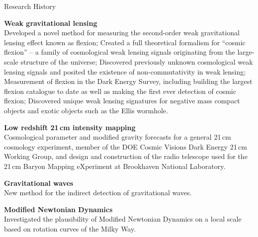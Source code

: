 \documentclass{resume} %
\begin{document}
\begin{rSection}{Research History}

\begin{description}[leftmargin=8em, style=nextline]

\item[\textnormal{2018 -- Present}] \textbf{Weak gravitational lensing}\\
   Developed a novel method for measuring the second-order weak gravitational lensing effect known as flexion;
  Created a full theoretical formalism for ``cosmic flexion'' -- a family of cosmological weak lensing signals originating from the large-scale structure of the universe;  Discovered previously unknown cosmological weak lensing signals and posited the existence of non-commutativity in weak lensing;
  Measurement of flexion in the Dark Energy Survey, including building the largest flexion catalogue to date as well as making the first ever detection of cosmic flexion;
  Discovered unique weak lensing signatures for negative mass compact objects and exotic objects such as the Ellis wormhole.
 
\item[\textnormal{2015 -- 2019}] \textbf{Low redshift 21$\,$cm intensity mapping}\\
 Cosmological parameter and modified gravity forecasts for a general 21$\,$cm cosmology 
 experiment, member of the DOE Cosmic Visions Dark Energy 21$\,$cm Working Group, and design and construction
 of the radio telescope used for the 21$\,$cm Baryon Mapping eXperiment at Brookhaven National
 Laboratory.
\item[\textnormal{2013}] \textbf{Gravitational waves}\\
  New method for the indirect detection of gravitational waves.
  
\item[\textnormal{2012}] \textbf{Modified Newtonian Dynamics}\\
 Investigated the plausibility of Modified Newtonian Dynamics on a local scale based on
 rotation curves of the Milky Way.

\end{description}

\end{rSection}

\end{document}
